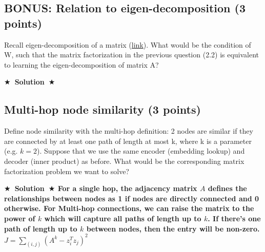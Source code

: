 \documentclass{article}
\numberwithin{figure}{section}
\newcommand{\Solution}[1]{{\medskip \color{red} \bf $\bigstar$~\sf \textbf{Solution}~$\bigstar$ \sf #1 } \bigskip}
\begin{document}
\subsection{BONUS: Relation to eigen-decomposition (3 points)}
Recall eigen-decomposition of a matrix (\href{https://en.wikipedia.org/wiki/Eigendecomposition_of_a_matrix}{link}). What would be the condition of W, such that the matrix factorization in the previous question (2.2) is equivalent to learning the eigen-decomposition of matrix A?

\Solution{}

\subsection{Multi-hop node similarity (3 points)}
Define node similarity with the multi-hop definition: 2 nodes are similar if they are connected by at least one path of length at most k, where k is a parameter (e.g. $k = 2$). Suppose that we use the same encoder (embedding lookup) and decoder (inner product) as before. What would be the corresponding matrix factorization problem we want to solve?

\Solution{
For a single hop, the adjacency matrix $A$ defines the relationships between nodes as 1 if nodes are directly connected and 0 otherwise. For Multi-hop connections, we can raise the matrix to the power of $k$ which will capture all paths of length up to $k$. If there's one path of length up to $k$ between nodes, then the entry will be non-zero.\\

$J = \sum_{(i,j)}(A^k - z_i^{T}z_j)^2$
\\\\

}
\end{document}
